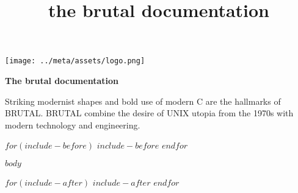 \documentclass{book}
\title{\bigskip \bigskip the brutal documentation}
\begin{document}
    \begin{titlepage}
        \centering
        \texttt{[image: ../meta/assets/logo.png]}

        \vfill

        {\bfseries\Large
            The brutal documentation\\  
        }

        Striking modernist shapes and bold use of modern C are the hallmarks of BRUTAL.
        BRUTAL combine the desire of UNIX utopia from the 1970s with modern technology and engineering.
    \end{titlepage}

    \tableofcontents

    \newpage

$for(include-before)$
$include-before$
$endfor$

$body$

$for(include-after)$
$include-after$
$endfor$
\end{document}

